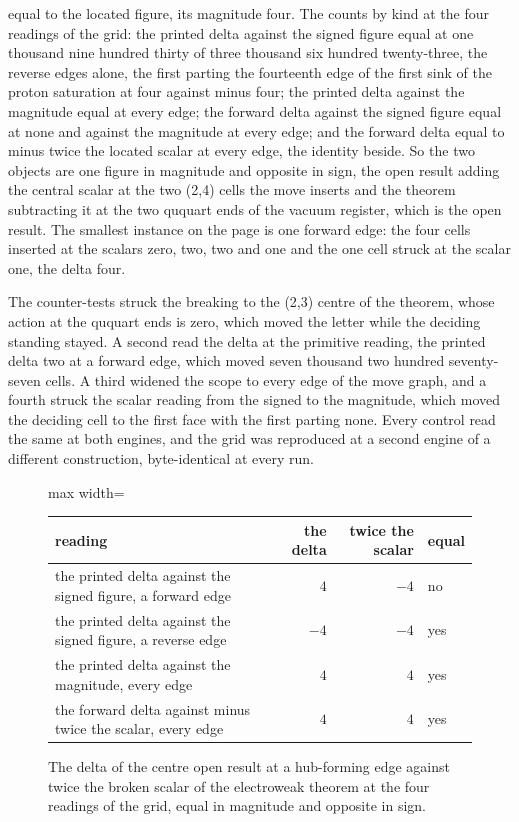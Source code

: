 \begin{chproof}
\begin{equation}
\end{equation}
equal to the located figure, its magnitude four. The counts by kind at the four readings of the grid: the printed delta against the signed figure equal at one thousand nine hundred thirty of three thousand six hundred twenty-three, the reverse edges alone, the first parting the fourteenth edge of the first sink of the proton saturation at four against minus four; the printed delta against the magnitude equal at every edge; the forward delta against the signed figure equal at none and against the magnitude at every edge; and the forward delta equal to minus twice the located scalar at every edge, the identity beside. So the two objects are one figure in magnitude and opposite in sign, the open result adding the central scalar at the two (2,4) cells the move inserts and the theorem subtracting it at the two ququart ends of the vacuum register, which is the open result. The smallest instance on the page is one forward edge: the four cells inserted at the scalars zero, two, two and one and the one cell struck at the scalar one, the delta four.

The counter-tests struck the breaking to the (2,3) centre of the theorem, whose action at the ququart ends is zero, which moved the letter while the deciding standing stayed. A second read the delta at the primitive reading, the printed delta two at a forward edge, which moved seven thousand two hundred seventy-seven cells. A third widened the scope to every edge of the move graph, and a fourth struck the scalar reading from the signed to the magnitude, which moved the deciding cell to the first face with the first parting none. Every control read the same at both engines, and the grid was reproduced at a second engine of a different construction, byte-identical at every run.
\end{chproof}
\begin{figure}[h]\centering
\begin{adjustbox}{max width=\linewidth}\begin{tabular}{lrrl}\toprule
reading & the delta & twice the scalar & equal \\ \midrule
the printed delta against the signed figure, a forward edge & $4$ & $-4$ & no \\
the printed delta against the signed figure, a reverse edge & $-4$ & $-4$ & yes \\
the printed delta against the magnitude, every edge & $4$ & $4$ & yes \\
the forward delta against minus twice the scalar, every edge & $4$ & $4$ & yes \\ \bottomrule
\end{tabular}\end{adjustbox}
\caption{The delta of the centre open result at a hub-forming edge against twice the broken scalar of the electroweak theorem at the four readings of the grid, equal in magnitude and opposite in sign.}
\end{figure}
